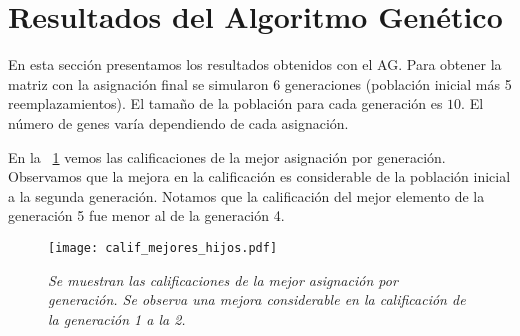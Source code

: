 \section{Resultados del Algoritmo Genético}

En esta sección presentamos los resultados obtenidos con el AG. Para obtener la matriz con la asignación final se simularon $6$ generaciones (población inicial más 5 reemplazamientos). El tamaño de la población para cada generación es $10$. El número de genes varía dependiendo de cada asignación.


En la \figurename{~\ref{EjcalifMejoresHijos}} vemos las calificaciones de la mejor asignación por generación. Observamos que la mejora en la calificación es considerable de la población inicial a la segunda generación. Notamos que la calificación del mejor elemento de la generación 5 fue menor al de la generación 4.

\begin{figure}[H]
\centering
\texttt{[image: calif\_mejores\_hijos.pdf]} %
\caption[\textit{Calificaciones de mejores asignaciones}]{\textit{Se muestran las calificaciones de la mejor asignación por generación. Se observa una mejora considerable en la calificación de la generación 1 a la 2.}}\label{EjcalifMejoresHijos}
\end{figure}

%

%


